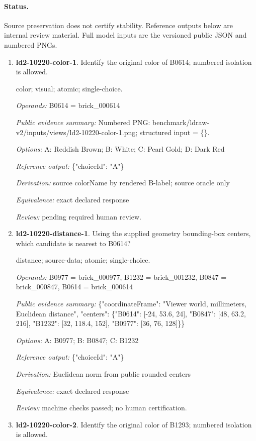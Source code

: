 \paragraph{Status.}Source preservation does not certify stability. Reference outputs below are internal review material. Full model inputs are the versioned public JSON and numbered PNGs.
\begin{enumerate}
\item \textbf{ld2-10220-color-1}. Identify the original color of B0614; numbered isolation is allowed.
\par{\small color; visual; atomic; single-choice.\par\textit{Operands:} B0614 = brick\_000614\par\textit{Public evidence summary:} Numbered PNG: benchmark/ldraw-v2/inputs/views/ld2-10220-color-1.png; structured input = \{\}.\par\textit{Options:} A: Reddish Brown; B: White; C: Pearl Gold; D: Dark Red\par\textit{Reference output:} \{"choiceId": "A"\}\par\textit{Derivation:} source colorName by rendered B-label; source oracle only\par\textit{Equivalence:} exact declared response\par\textit{Review:} pending required human review.}
\item \textbf{ld2-10220-distance-1}. Using the supplied geometry bounding-box centers, which candidate is nearest to B0614?
\par{\small distance; source-data; atomic; single-choice.\par\textit{Operands:} B0977 = brick\_000977, B1232 = brick\_001232, B0847 = brick\_000847, B0614 = brick\_000614\par\textit{Public evidence summary:} \{"coordinateFrame": "Viewer world, millimeters, Euclidean distance", "centers": \{"B0614": [-24, 53.6, 24], "B0847": [48, 63.2, 216], "B1232": [32, 118.4, 152], "B0977": [36, 76, 128]\}\}\par\textit{Options:} A: B0977; B: B0847; C: B1232\par\textit{Reference output:} \{"choiceId": "A"\}\par\textit{Derivation:} Euclidean norm from public rounded centers\par\textit{Equivalence:} exact declared response\par\textit{Review:} machine checks passed; no human certification.}
\item \textbf{ld2-10220-color-2}. Identify the original color of B1293; numbered isolation is allowed.

\end{enumerate}
